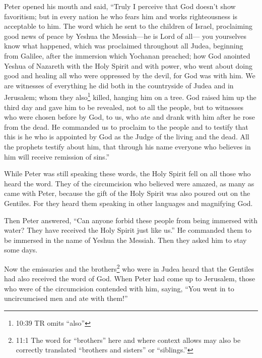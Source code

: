 \myverse{}Peter opened his mouth and said, “Truly I perceive that God
doesn’t show favoritism;
\myverse{}but in every nation he who fears him and works righteousness is acceptable
to him.
\myverse{}The word which he sent to the children of Israel, proclaiming good news of
peace by Yeshua the Messiah—he is Lord of all—
\myverse{}you yourselves know what happened, which was proclaimed throughout all Judea,
beginning from Galilee, after the immersion which Yochanan preached;
\myverse{}how God anointed Yeshua of Nazareth with the Holy Spirit and with power,
who went about doing good and healing all who were oppressed by the devil, for God was with him.
\myverse{}We are witnesses of everything he did both in the countryside of Judea and
in Jerusalem; whom they also\footnote{10:39 TR omits “also”} killed, hanging him on a tree.
\myverse{}God raised him up the third day and gave him to be revealed,
\myverse{}not to all the people, but to witnesses who were chosen before by God, to
us, who ate and drank with him after he rose from the dead.
\myverse{}He commanded us to proclaim to the people and to testify that this is he
who is appointed by God as the Judge of the living and the dead.
\myverse{}All the prophets testify about him, that through his name everyone who believes
in him will receive remission of sins.”

\myverse{}While Peter was still speaking these words, the Holy Spirit
fell on all those who heard the word.
\myverse{}They of the circumcision who believed were amazed, as many as came with Peter,
because the gift of the Holy Spirit was also poured out on the Gentiles.
\myverse{}For they heard them speaking in other languages and magnifying God.

Then Peter answered,
\myverse{}“Can anyone forbid these people from being immersed with water? They have
received the Holy Spirit just like us.”
\myverse{}He commanded them to be immersed in the name of Yeshua the Messiah. Then
they asked him to stay some days.


\mychapter{} \myverse*{}Now the emissaries and the brothers\footnote{11:1 The word for “brothers” here and where context allows may also be correctly translated “brothers
	and sisters” or “siblings.”} who were in Judea heard that the Gentiles had also received the word
of God.
\myverse{}When Peter had come up to Jerusalem, those who were of the circumcision contended
with him,
\myverse{}saying, “You went in to uncircumcised men and ate with them!”

